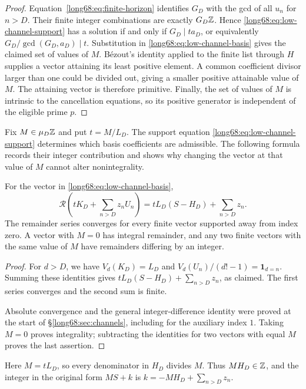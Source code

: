 \documentclass[11pt]{article}
\newcommand{\Ser}{S}
\begin{document}
\begin{proof}
Equation~\eqref{long68:eq:finite-horizon} identifies $G_D$ with the gcd of
all $u_n$ for $n>D$. Their finite integer combinations are exactly
$G_D\mathbb{Z}$. Hence \eqref{long68:eq:low-channel-support} has a solution if
and only if $G_D\mid ta_D$, or equivalently
$G_D/\gcd(G_D,a_D)\mid t$. Substitution in
\eqref{long68:eq:low-channel-basis} gives the claimed set of values of $M$.
B\'ezout's identity applied to the finite list through $H$ supplies a
vector attaining its least positive element. A common coefficient divisor
larger than one could be divided out, giving a smaller positive attainable
value of $M$. The attaining vector is therefore primitive. Finally, the set of
values of $M$ is intrinsic to the cancellation equations, so its positive
generator is independent of the eligible prime $p$.
\end{proof}

Fix $M\in\mu_D\mathbb{Z}$ and put $t=M/L_D$. The support equation
\eqref{long68:eq:low-channel-support} determines which basis coefficients
are admissible. The following formula records their integer contribution
and shows why changing the vector at that value of $M$ cannot alter
nonintegrality.

\begin{theorem}\label{long68:res:residual-transparency}
For the vector in \eqref{long68:eq:low-channel-basis},
\[
 \mathcal R\!\left(tK_D+\sum_{n>D}z_nU_n\right)
 =tL_D(\Ser-H_D)+\sum_{n>D}z_n.
\]
The remainder series converges for every finite vector supported away from
index zero.  A vector with $M=0$ has integral remainder, and any two finite
vectors with the same value of $M$ have remainders differing by an integer.
\end{theorem}

\begin{proof}
For $d>D$, we have $V_d(K_D)=L_D$ and
$V_d(U_n)/(d!-1)=\mathbf1_{d=n}$. Summing these identities gives
$tL_D(S-H_D)+\sum_{n>D}z_n$, as claimed. The first series converges and
the second sum is finite.

Absolute convergence and the general integer-difference identity were
proved at the start of \S\ref{long68:sec:channels}, including for the
auxiliary index $1$. Taking $M=0$ proves integrality;
subtracting the identities for two vectors with equal $M$ proves the
last assertion.
\end{proof}

Here $M=tL_D$, so every denominator in $H_D$ divides $M$. Thus
$MH_D\in\mathbb{Z}$, and the integer in the original form $MS+k$ is
$k=-MH_D+\sum_{n>D}z_n$.
\end{document}

